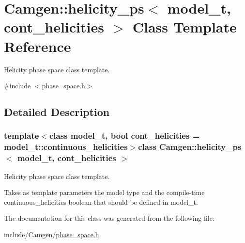 \hypertarget{a00272}{\section{Camgen\-:\-:helicity\-\_\-ps$<$ model\-\_\-t, cont\-\_\-helicities $>$ Class Template Reference}
\label{a00272}
}


Helicity phase space class template.  




{\ttfamily \#include $<$phase\-\_\-space.\-h$>$}



\subsection{Detailed Description}
\subsubsection*{template$<$class model\-\_\-t, bool cont\-\_\-helicities = model\-\_\-t\-::continuous\-\_\-helicities$>$class Camgen\-::helicity\-\_\-ps$<$ model\-\_\-t, cont\-\_\-helicities $>$}

Helicity phase space class template. 

Takes as template parameters the model type and the compile-\/time continuous\-\_\-helicities boolean that should be defined in model\-\_\-t. 

The documentation for this class was generated from the following file\-:\begin{DoxyCompactItemize}
\item 
include/\-Camgen/\hyperlink{a00694}{phase\-\_\-space.\-h}\end{DoxyCompactItemize}

